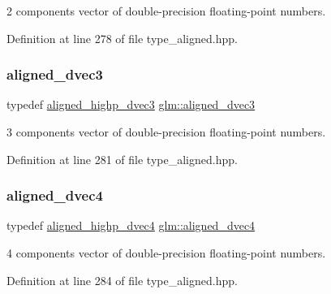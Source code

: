 2 components vector of double-\/precision floating-\/point numbers. 



Definition at line 278 of file type\+\_\+aligned.\+hpp.

\mbox{\label{group__gtc__type__aligned_ga82da11893fbac3bda647c9de9da62693}} 
\subsubsection{\texorpdfstring{aligned\_dvec3}{aligned\_dvec3}}
{\footnotesize\ttfamily typedef \mbox{\hyperlink{group__gtc__type__aligned_ga8f0cf063fb87e4bd3a26ec242a71d75d}{aligned\+\_\+highp\+\_\+dvec3}} \mbox{\hyperlink{group__gtc__type__aligned_ga82da11893fbac3bda647c9de9da62693}{glm\+::aligned\+\_\+dvec3}}}



3 components vector of double-\/precision floating-\/point numbers. 



Definition at line 281 of file type\+\_\+aligned.\+hpp.

\mbox{\label{group__gtc__type__aligned_ga502d8d084a488118c9a5466d73ba1a46}} 
\subsubsection{\texorpdfstring{aligned\_dvec4}{aligned\_dvec4}}
{\footnotesize\ttfamily typedef \mbox{\hyperlink{group__gtc__type__aligned_ga96f78b78823a228d1ca0cfa3be7e6a64}{aligned\+\_\+highp\+\_\+dvec4}} \mbox{\hyperlink{group__gtc__type__aligned_ga502d8d084a488118c9a5466d73ba1a46}{glm\+::aligned\+\_\+dvec4}}}



4 components vector of double-\/precision floating-\/point numbers. 



Definition at line 284 of file type\+\_\+aligned.\+hpp.

\mbox{\label{group__gtc__type__aligned_ga3e78791d8be2a1766bc7bc9d666f0f7f}} 
